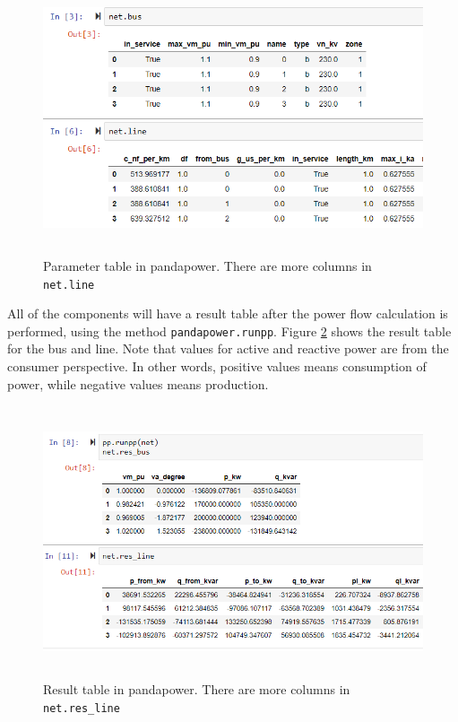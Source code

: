 \documentclass[class=book, crop=false]{standalone}
\begin{document}
\begin{figure}[H]
    \includegraphics[height=8cm, width=13.5cm]{figures/case4g_line_bus.PNG}
    \caption[size = 9]{Parameter table in pandapower. There are more columns in \texttt{net.line}}
    \label{fig:method:line_bus_dataframe}
\end{figure}
All of the components will have a result table after the power flow calculation is performed, using the method \texttt{pandapower.runpp}. Figure \ref{fig:method:res_line_bus_dataframe} shows the result table for the bus and line. Note that values for active and reactive power are from the consumer perspective. In other words, positive values means consumption of power, while negative values means production.

\begin{figure}[H]
    \includegraphics[height=8cm, width=14cm]{figures/case4g_line_bus_res.PNG}
    \caption[size = 9]{Result table in pandapower. There are more columns in \texttt{net.res\_line}}
    \label{fig:method:res_line_bus_dataframe}
\end{figure}
\end{document}
